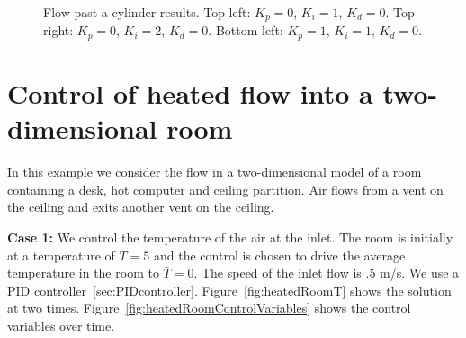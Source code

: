 \documentclass[11pt]{article}
\begin{document}
\begin{figure}[hbt]
\newcommand{\figWidth}{6.5cm}
\newcommand{\trimfig}[2]{\trimFig{#1}{#2}{0.0}{0.0}{.0}{.0}}
\begin{center}
\end{center}
  \caption{Flow past a cylinder results. Top left: $K_p=0$, $K_i=1$, $K_d=0$. Top right:  $K_p=0$, $K_i=2$, $K_d=0$.
Bottom left:  $K_p=1$, $K_i=1$, $K_d=0$. }
  \label{fig:flowCylControlVariables}
\end{figure}


\clearpage 
\section{Control of heated flow into a two-dimensional room}

In this example we consider the flow in a two-dimensional model of a room containing
a desk, hot computer and ceiling partition. Air flows from a vent on the ceiling and exits
another vent on the ceiling. 




{\bf Case 1:} We control the temperature of the air at the inlet. The room is
initially at a temperature of $T=5$ and the control is chosen to drive the
average temperature in the room to $\bar{T}=0$. The speed of the inlet flow is $.5$ m/s.
We use a PID controller~\ref{sec:PIDcontroller}.
Figure~\ref{fig:heatedRoomT} shows the solution at two
times. Figure~\ref{fig:heatedRoomControlVariables} shows the control variables
over time.
\end{document}
